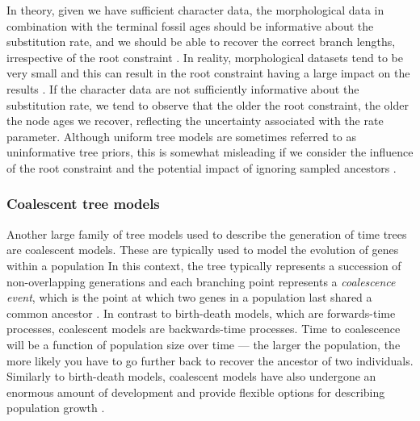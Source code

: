 In theory, given we have sufficient character data, the morphological data in combination with the terminal fossil ages should be informative about the substitution rate, and we should be able to recover the correct branch lengths, irrespective of the root constraint \citep{Ronquist2012a,Klopfstein2019}.
In reality, morphological datasets tend to be very small and this can result in the root constraint having a large impact on the results \citep{matzke2016}.
If the character data are not sufficiently informative about the substitution rate, we tend to observe that the older the root constraint, the older the node ages we recover, reflecting the uncertainty associated with the rate parameter.
Although uniform tree models are sometimes referred to as uninformative tree priors, this is somewhat misleading if we consider the influence of the root constraint and the potential impact of ignoring sampled ancestors \citep{Gavryushkina2014}.

\subsubsection{Coalescent tree models}
Another large family of tree models used to describe the generation of time trees are coalescent models. 
These are typically used to model the evolution of genes within a population
In this context, the tree typically represents a succession of non-overlapping generations and each branching point represents a \textit{coalescence event}, which is the point at which two genes in a population last shared a common ancestor \citep{Kingman1982}.
In contrast to birth-death models, which are forwards-time processes, coalescent models are backwards-time processes.
Time to coalescence will be a function of population size over time --- the larger the population, the more likely you have to go further back to recover the ancestor of two individuals. %
Similarly to birth-death models, coalescent models have also undergone an enormous amount of development and provide flexible options for describing population growth \citep{Beerli2001, Drummond2005, Mashayekhi2019}. %

